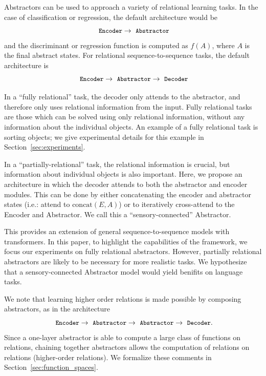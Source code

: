 Abstractors can be used to approach a variety of relational learning tasks. In the case of classification
or regression, the default architecture would be
$$\module{Encoder} \rightarrow \module{Abstractor}$$
and the discriminant or regression function is computed as $f(A)$, where $A$ is the final abstract states.
For relational sequence-to-sequence tasks, the default architecture is
$$\module{Encoder} \rightarrow \module{Abstractor} \rightarrow \module{Decoder}$$

In a ``fully relational'' task, the decoder only attends to the abstractor, and therefore only uses relational information from the input. Fully relational tasks are those which can be solved using only relational information, without any information about the individual objects. An example of a fully relational task is sorting objects; we give experimental details for this example in Section~\ref{sec:experiments}.

In a ``partially-relational'' task, the relational information is crucial, but information about individual objects is also important. Here, we propose an architecture in which the decoder attends to both the abstractor and encoder modules. This can be done by either concatenating the encoder and abstractor states (i.e.: attend to $\text{concat}(E, A)$) or to iteratively cross-attend to the Encoder and Abstractor. We call this a ``sensory-connected'' Abstractor.

This provides an extension of general sequence-to-sequence models with transformers. In this paper, to highlight the capabilities of the framework, we focus our experiments on fully relational abstractors. However, partially relational abstractors are likely to be necessary for more realistic tasks. We hypothesize that a sensory-connected Abstractor model would yield benifits on language tasks.

We note that learning higher order relations is made possible by composing
abstractors, as in the architecture
$$\module{Encoder} \rightarrow \module{Abstractor} \rightarrow \module{Abstractor} \rightarrow \module{Decoder}.$$
Since a one-layer abstractor is able to compute a large class of functions on relations, chaining together abstractors allows the computation of relations on relations (higher-order relations). We formalize these comments in Section~\ref{sec:function_spaces}.

